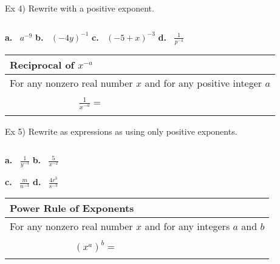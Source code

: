 \documentclass{ximera}
\begin{document}
\noindent Ex 4) Rewrite with a positive exponent.

$~$

\textbf{a.}$~~~~$$\displaystyle a^{-9}$\hspace{1in} \textbf{b.}$~~~~$$\displaystyle (-4y)^{-1}$\hspace{1in}
\textbf{c.}$~~~~$$\displaystyle (-5+x)^{-3}  $\hspace{1in} \textbf{d.}$~~~~$$\displaystyle \frac{1}{p^{-4}}$

\vspace{1in}

\begin{center} \begin{tabular}{|l|}
\hline 
Reciprocal of $x^{-a}$\\
\hline
For any nonzero real number $x$ and for any positive integer $a$\\
$~$\\
$~~~~~~~~~~~~~~~~~~~~~~~~~~~~~~~~${\Large$\displaystyle \frac{1}{x^{-a}} = $}\\
$~$\\
\hline
\end{tabular} \end{center}

\noindent Ex 5) Rewrite as expressions as using only positive exponents.

$~$

\textbf{a.}$~~~~$$\displaystyle \frac{1}{y^{-3}}$\hspace{2in} \textbf{b.}$~~~~$$\displaystyle \frac{5}{x^{-2}}$

\vspace{.5in}

\hspace{1in}\textbf{c.}$~~~~$$\displaystyle \frac{m}{n^{-3}}  $\hspace{2in} \textbf{d.}$~~~~$$\displaystyle \frac{4r^3}{s^{-3}}$

\vspace{.5in}

\begin{center} \begin{tabular}{|l|}
\hline 
Power Rule of Exponents\\
\hline
For any nonzero real number $x$ and for any integers $a$ and $b$\\
$~$\\
$~~~~~~~~~~~~~~~~~~~~~~~~~~~~~~${\Large$\displaystyle \left(x^a\right)^b=~~~~$}\\
$~$\\
\hline
\end{tabular} \end{center}
\end{document}
